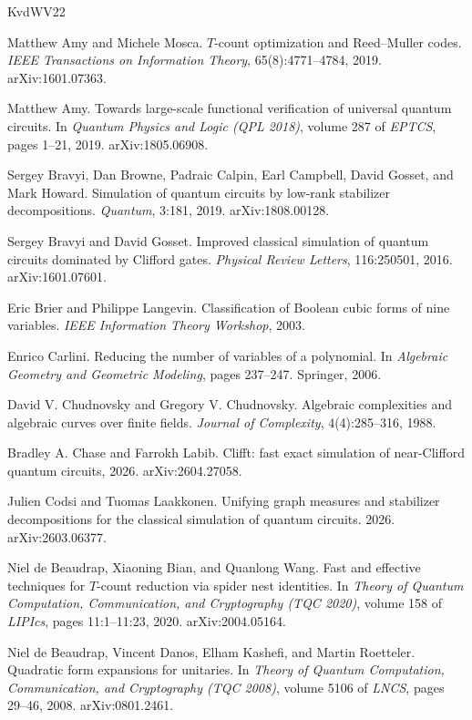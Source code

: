 \documentclass[11pt]{article}
\theoremstyle{definition}
\theoremstyle{remark}
\begin{document}
\begin{thebibliography}{KvdWV22}\small

 Matthew Amy and Michele Mosca. $T$-count optimization and Reed--Muller codes. \emph{IEEE Transactions on Information Theory}, 65(8):4771--4784, 2019. arXiv:1601.07363.

 Matthew Amy. Towards large-scale functional verification of universal quantum circuits. In \emph{Quantum Physics and Logic (QPL 2018)}, volume 287 of \emph{EPTCS}, pages 1--21, 2019. arXiv:1805.06908.

 Sergey Bravyi, Dan Browne, Padraic Calpin, Earl Campbell, David Gosset, and Mark Howard. Simulation of quantum circuits by low-rank stabilizer decompositions. \emph{Quantum}, 3:181, 2019. arXiv:1808.00128.

 Sergey Bravyi and David Gosset. Improved classical simulation of quantum circuits dominated by Clifford gates. \emph{Physical Review Letters}, 116:250501, 2016. arXiv:1601.07601.

 Eric Brier and Philippe Langevin. Classification of Boolean cubic forms of nine variables. \emph{IEEE Information Theory Workshop}, 2003.

 Enrico Carlini. Reducing the number of variables of a polynomial. In \emph{Algebraic Geometry and Geometric Modeling}, pages 237--247. Springer, 2006.

 David V. Chudnovsky and Gregory V. Chudnovsky. Algebraic complexities and algebraic curves over finite fields. \emph{Journal of Complexity}, 4(4):285--316, 1988.

 Bradley A. Chase and Farrokh Labib. Clifft: fast exact simulation of near-Clifford quantum circuits, 2026. arXiv:2604.27058.

 Julien Codsi and Tuomas Laakkonen. Unifying graph measures and stabilizer decompositions for the classical simulation of quantum circuits. 2026. arXiv:2603.06377.

 Niel de Beaudrap, Xiaoning Bian, and Quanlong Wang. Fast and effective techniques for $T$-count reduction via spider nest identities. In \emph{Theory of Quantum Computation, Communication, and Cryptography (TQC 2020)}, volume 158 of \emph{LIPIcs}, pages 11:1--11:23, 2020. arXiv:2004.05164.

 Niel de Beaudrap, Vincent Danos, Elham Kashefi, and Martin Roetteler. Quadratic form expansions for unitaries. In \emph{Theory of Quantum Computation, Communication, and Cryptography (TQC 2008)}, volume 5106 of \emph{LNCS}, pages 29--46, 2008. arXiv:0801.2461.


\end{thebibliography}
\end{document}
